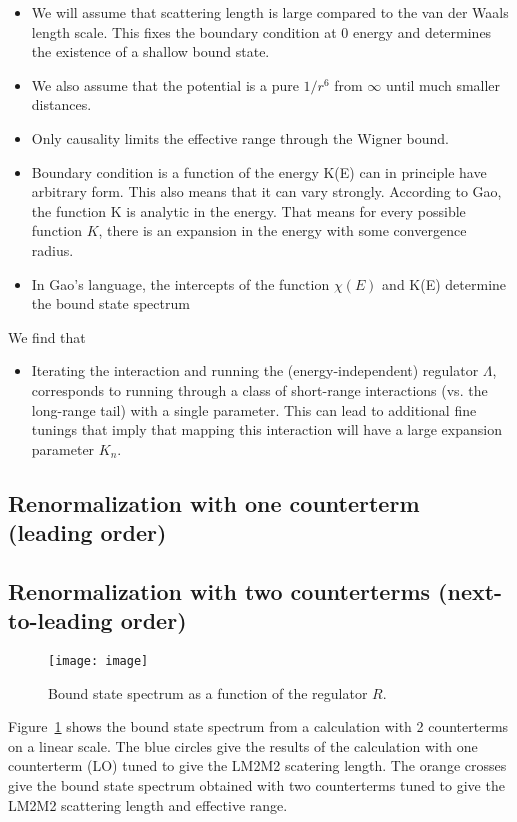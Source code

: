 \documentclass[aps,preprint,superscriptaddress]{revtex4-1}
\begin{document}
\begin{itemize}
\item We will assume that scattering length is large compared to the van der
  Waals length scale. This fixes the boundary condition at 0 energy
  and determines the existence of a shallow bound state.
\item We also assume that the potential is a pure $1/r^6$ from
  $\infty$ until much smaller distances.
\item Only causality limits the effective range through the Wigner
  bound.
\item Boundary condition is a function of the energy K(E) can in
  principle have arbitrary form. This also means that it can vary
  strongly. According to Gao, the function K is analytic in the
  energy. That means for every possible function $K$, there is an
  expansion in the energy with some convergence radius.
\item In Gao’s language, the intercepts of the function $\chi(E)$ and
  K(E) determine the bound state spectrum
\end{itemize}

We find that
\begin{itemize}
\item Iterating the interaction and running the (energy-independent)
  regulator $\Lambda$, corresponds to running through a class of
  short-range interactions (vs. the long-range tail) with a single
  parameter. This can lead to additional fine tunings that imply that
  mapping this interaction will have a large expansion parameter
  $K_n$.
\end{itemize}

\subsection{Renormalization with one counterterm (leading order)}


\subsection{Renormalization with two counterterms (next-to-leading
  order)}
\begin{figure}[t]
\begin{center}
\texttt{[image: image]} 
\end{center}
\caption{Bound state spectrum as a function of the regulator $R$.}
\label{fig:bs-spectrum-lo}
\end{figure}
Figure~\ref{fig:bs-spectrum-lo} shows the bound state spectrum from a
calculation with 2 counterterms on a linear scale. The blue circles
give the results of the calculation with one counterterm (LO) tuned to
give the LM2M2 scatering length. The orange crosses give the bound
state spectrum obtained with two counterterms tuned to give the LM2M2
scattering length and effective range.
\end{document}
